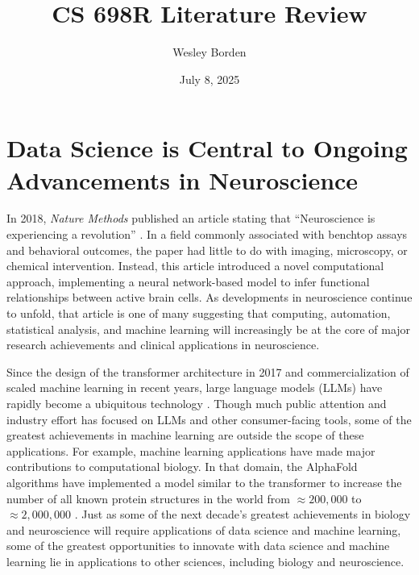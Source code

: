 \documentclass[11pt]{article}
\title{CS 698R Literature Review}
\author{Wesley Borden}
\date{July 8, 2025}
\newcommand{\sectionwithindent}[1]{
    \section*{#1}
    \hspace{\parindent} %
}
\begin{document}
\sectionwithindent{Data Science is Central to Ongoing Advancements in Neuroscience}
In 2018, \textit{Nature Methods} published an article stating that ``Neuroscience is experiencing a revolution'' \cite{pandarinath2018autoencoders}. In a field commonly associated with benchtop assays and behavioral outcomes, the paper had little to do with imaging, microscopy, or chemical intervention. Instead, this article introduced a novel computational approach, implementing a neural network-based model to infer functional relationships between active brain cells. As developments in neuroscience continue to unfold, that article is one of many suggesting that computing, automation, statistical analysis, and machine learning will increasingly be at the core of major research achievements and clinical applications in neuroscience.

Since the design of the transformer architecture in 2017 \cite{vaswani2023attentionneed} and commercialization of scaled machine learning in recent years, large language models (LLMs) have rapidly become a ubiquitous technology \cite{wikipedia2025llm}. Though much public attention and industry effort has focused on LLMs and other consumer-facing tools, some of the greatest achievements in machine learning are outside the scope of these applications. For example, machine learning applications have made major contributions to computational biology. In that domain, the AlphaFold algorithms have implemented a model similar to the transformer to increase the number of all known protein structures in the world from $\approx200,000$ to $\approx2,000,000$ \cite{jumper2021alphafold, wikipedia2025alphafold, wikipedia2025pdb}. Just as some of the next decade's greatest achievements in biology and neuroscience will require applications of data science and machine learning, some of the greatest opportunities to innovate with data science and machine learning lie in applications to other sciences, including biology and neuroscience.
\end{document}
